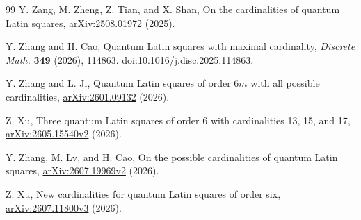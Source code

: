 \documentclass[11pt]{article}
\theoremstyle{definition}
\begin{document}
\begin{thebibliography}{99}
Y. Zang, M. Zheng, Z. Tian, and X. Shan,
\newblock On the cardinalities of quantum Latin squares,
\newblock \href{https://arxiv.org/abs/2508.01972}
{arXiv:2508.01972} (2025).

Y. Zhang and H. Cao,
\newblock Quantum Latin squares with maximal cardinality,
\newblock \emph{Discrete Math.} \textbf{349} (2026), 114863.
\newblock \href{https://doi.org/10.1016/j.disc.2025.114863}
{doi:10.1016/j.disc.2025.114863}.

Y. Zhang and L. Ji,
\newblock Quantum Latin squares of order $6m$ with all possible cardinalities,
\newblock \href{https://arxiv.org/abs/2601.09132}
{arXiv:2601.09132} (2026).

Z. Xu,
\newblock Three quantum Latin squares of order 6 with cardinalities 13, 15,
and 17,
\newblock \href{https://arxiv.org/abs/2605.15540v2}
{arXiv:2605.15540v2} (2026).

Y. Zhang, M. Lv, and H. Cao,
\newblock On the possible cardinalities of quantum Latin squares,
\newblock \href{https://arxiv.org/abs/2607.19969v2}
{arXiv:2607.19969v2} (2026).

Z. Xu,
\newblock New cardinalities for quantum Latin squares of order six,
\newblock \href{https://arxiv.org/abs/2607.11800v3}
{arXiv:2607.11800v3} (2026).

\end{thebibliography}
\end{document}
